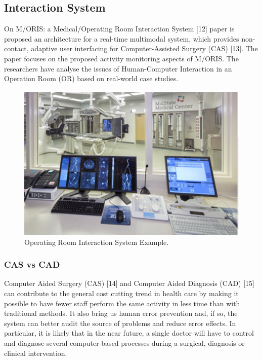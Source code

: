 \subsection{Interaction System}

On M/ORIS: a Medical/Operating Room Interaction System [12] paper is proposed an architecture for a real-time multimodal system, which provides non-contact, adaptive user interfacing for Computer-Assisted Surgery (CAS) [13]. The paper focuses on the proposed activity monitoring aspects of M/ORIS. The researchers have analyse the issues of Human-Computer Interaction in an Operation Room (OR) based on real-world case studies.

\begin{figure}[!hbt]
\centering
\includegraphics[width=1.00\textwidth]{moris.png}
\caption{\label{fig:moris}Operating Room Interaction System Example.
}
\end{figure}

\clearpage

\subsubsection{CAS vs CAD}

Computer Aided Surgery (CAS) [14] and Computer Aided Diagnosis (CAD) [15] can contribute to the general cost cutting trend in health care by making it possible to have fewer staff perform the same activity in less time than with traditional methods. It also bring us human error prevention and, if so, the system can better audit the source of problems and reduce error effects. In particular, it is likely that in the near future, a single doctor will have to control and diagnose several computer-based processes during a surgical, diagnosis or clinical intervention.

